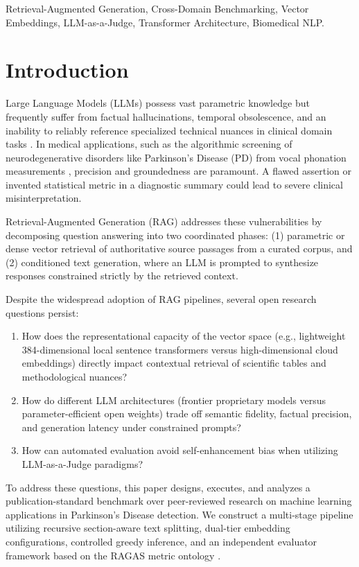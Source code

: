 \documentclass[conference]{IEEEtran}
\begin{document}
\begin{IEEEkeywords}
Retrieval-Augmented Generation, Cross-Domain Benchmarking, Vector Embeddings, LLM-as-a-Judge, Transformer Architecture, Biomedical NLP.
\end{IEEEkeywords}

\section{Introduction}
Large Language Models (LLMs) possess vast parametric knowledge but frequently suffer from factual hallucinations, temporal obsolescence, and an inability to reliably reference specialized technical nuances in clinical domain tasks \cite{lewis2020rag}. In medical applications, such as the algorithmic screening of neurodegenerative disorders like Parkinson's Disease (PD) from vocal phonation measurements \cite{govindu2023early}, precision and groundedness are paramount. A flawed assertion or invented statistical metric in a diagnostic summary could lead to severe clinical misinterpretation.

Retrieval-Augmented Generation (RAG) addresses these vulnerabilities by decomposing question answering into two coordinated phases: (1) parametric or dense vector retrieval of authoritative source passages from a curated corpus, and (2) conditioned text generation, where an LLM is prompted to synthesize responses constrained strictly by the retrieved context.

Despite the widespread adoption of RAG pipelines, several open research questions persist:
\begin{enumerate}
    \item How does the representational capacity of the vector space (e.g., lightweight 384-dimensional local sentence transformers versus high-dimensional cloud embeddings) directly impact contextual retrieval of scientific tables and methodological nuances?
    \item How do different LLM architectures (frontier proprietary models versus parameter-efficient open weights) trade off semantic fidelity, factual precision, and generation latency under constrained prompts?
    \item How can automated evaluation avoid self-enhancement bias when utilizing LLM-as-a-Judge paradigms?
\end{enumerate}

To address these questions, this paper designs, executes, and analyzes a publication-standard benchmark over peer-reviewed research on machine learning applications in Parkinson's Disease detection. We construct a multi-stage pipeline utilizing recursive section-aware text splitting, dual-tier embedding configurations, controlled greedy inference, and an independent evaluator framework based on the RAGAS metric ontology \cite{es2023ragas}.
\end{document}
